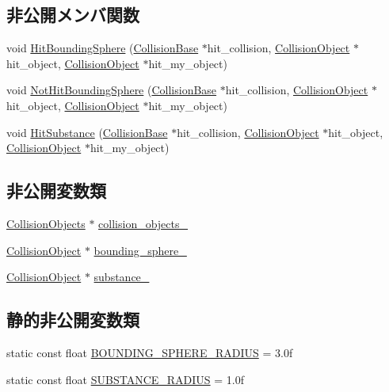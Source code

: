 \subsection*{非公開メンバ関数}
\begin{DoxyCompactItemize}
\item 
void \mbox{\hyperlink{class_player_collision_ae54c44acd4a1ef4569c1bb9202af3570}{Hit\+Bounding\+Sphere}} (\mbox{\hyperlink{class_collision_base}{Collision\+Base}} $\ast$hit\+\_\+collision, \mbox{\hyperlink{class_collision_object}{Collision\+Object}} $\ast$hit\+\_\+object, \mbox{\hyperlink{class_collision_object}{Collision\+Object}} $\ast$hit\+\_\+my\+\_\+object)
\item 
void \mbox{\hyperlink{class_player_collision_adce9e2df2361cadba7bbe397810a1893}{Not\+Hit\+Bounding\+Sphere}} (\mbox{\hyperlink{class_collision_base}{Collision\+Base}} $\ast$hit\+\_\+collision, \mbox{\hyperlink{class_collision_object}{Collision\+Object}} $\ast$hit\+\_\+object, \mbox{\hyperlink{class_collision_object}{Collision\+Object}} $\ast$hit\+\_\+my\+\_\+object)
\item 
void \mbox{\hyperlink{class_player_collision_a5048cc608d72d03d02b23c5533dbfd10}{Hit\+Substance}} (\mbox{\hyperlink{class_collision_base}{Collision\+Base}} $\ast$hit\+\_\+collision, \mbox{\hyperlink{class_collision_object}{Collision\+Object}} $\ast$hit\+\_\+object, \mbox{\hyperlink{class_collision_object}{Collision\+Object}} $\ast$hit\+\_\+my\+\_\+object)
\end{DoxyCompactItemize}
\subsection*{非公開変数類}
\begin{DoxyCompactItemize}
\item 
\mbox{\hyperlink{class_collision_objects}{Collision\+Objects}} $\ast$ \mbox{\hyperlink{class_player_collision_a6d1b6d6e69a44697fdd3e6d74939fc17}{collision\+\_\+objects\+\_\+}}
\item 
\mbox{\hyperlink{class_collision_object}{Collision\+Object}} $\ast$ \mbox{\hyperlink{class_player_collision_adf8368bcd0e09b6ddd8cb2756daf2d48}{bounding\+\_\+sphere\+\_\+}}
\item 
\mbox{\hyperlink{class_collision_object}{Collision\+Object}} $\ast$ \mbox{\hyperlink{class_player_collision_a96ea29b4d3b42d6e3bba7f609ba9f1ea}{substance\+\_\+}}
\end{DoxyCompactItemize}
\subsection*{静的非公開変数類}
\begin{DoxyCompactItemize}
\item 
static const float \mbox{\hyperlink{class_player_collision_a4582ff2dada9d60339a67f37d15119a2}{B\+O\+U\+N\+D\+I\+N\+G\+\_\+\+S\+P\+H\+E\+R\+E\+\_\+\+R\+A\+D\+I\+US}} = 3.\+0f
\item 
static const float \mbox{\hyperlink{class_player_collision_ab6bab4a28016089c86a90d3f77f46fdf}{S\+U\+B\+S\+T\+A\+N\+C\+E\+\_\+\+R\+A\+D\+I\+US}} = 1.\+0f
\end{DoxyCompactItemize}


